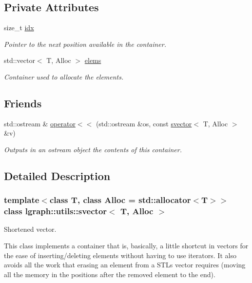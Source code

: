 \subsection*{Private Attributes}
\begin{DoxyCompactItemize}
\item 
size\+\_\+t \hyperlink{classlgraph_1_1utils_1_1svector_a7ef963c079c7dc8a6a559ceef81a241f}{idx}
\begin{DoxyCompactList}\small\item\em Pointer to the next position available in the container. \end{DoxyCompactList}\item 
std\+::vector$<$ T, Alloc $>$ \hyperlink{classlgraph_1_1utils_1_1svector_aa72e9ffeb58f88d3cb01671e3e672a45}{elems}
\begin{DoxyCompactList}\small\item\em Container used to allocate the elements. \end{DoxyCompactList}\end{DoxyCompactItemize}
\subsection*{Friends}
\begin{DoxyCompactItemize}
\item 
std\+::ostream \& \hyperlink{classlgraph_1_1utils_1_1svector_a0917cbb972bd75239a20e86164b5f7b6}{operator$<$$<$} (std\+::ostream \&os, const \hyperlink{classlgraph_1_1utils_1_1svector}{svector}$<$ T, Alloc $>$ \&v)
\begin{DoxyCompactList}\small\item\em Outputs in an ostream object the contents of this container. \end{DoxyCompactList}\end{DoxyCompactItemize}


\subsection{Detailed Description}
\subsubsection*{template$<$class T, class Alloc = std\+::allocator$<$\+T$>$$>$\newline
class lgraph\+::utils\+::svector$<$ T, Alloc $>$}

Shortened vector. 

This class implements a container that is, basically, a little shortcut in vectors for the ease of inserting/deleting elements without having to use iterators. It also avoids all the work that erasing an element from a S\+TL\textquotesingle{}s vector requires (moving all the memory in the positions after the removed element to the end).

